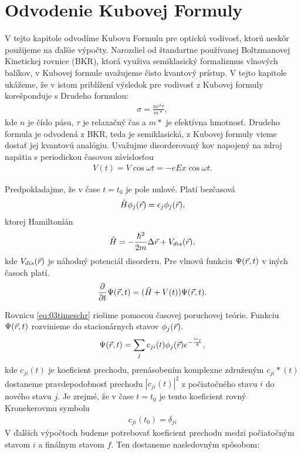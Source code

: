 \section{Odvodenie Kubovej Formuly}
V tejto kapitole odvodíme Kubovu Formulu pre optickú vodivosť, ktorú neskôr použijeme na ďalšie výpočty.
Narozdiel od štandartne používanej Boltzmanovej Kinetickej rovnice (BKR), ktorá využiva semiklasický 
formalizmus vlnových balíkov, v Kubovej formule uvažujeme čisto kvantový prístup. V tejto kapitole 
ukážeme, že v istom priblížení výsledok pre vodivosť z Kubovej formuly korešponduje s Drudeho formulou:
\begin{align}
\label{eq:03drude}
\sigma=\frac{ne^2\tau}{m*}\mathrm{,}
\end{align}
kde $n$ je číslo pásu, $\tau$ je relaxačný čas a $m*$ je efektívna hmotnosť. Drudeho formula je odvodená z 
BKR, teda je semiklasická, z Kubovej formuly vieme dostať jej kvantovú analógiu.
Uvažujme disorderovaný kov napojený na zdroj napätia s periodickou časovou závislosťou
\begin{align}
\label{eq:03potential}
V(t)=V\cos \omega t = -eEx \cos \omega t \mathrm{.}
\end{align}

Predpokladajme, že v čase $t=t_0$ je pole nulové. Platí bezčasová \schr
\begin{align}
\label{eq:03schr}
\hat{H} \phi_j(\vec{r})= \epsilon_j\phi_j(\vec{r}) \mathrm{,}
\end{align}
ktorej Hamiltoníán
\begin{align}
\label{eq:03Hamiltonian}
\hat{H}= - \frac{\hbar^2}{2m}\Delta \vec{r} + V_{dis}(\vec{r}) \mathrm{,} 
\end{align}
kde $V_{dis}(\vec{r})$ je náhodný potenciál disorderu. Pre vlnovú funkciu $\Psi(\vec{r},t)$ v iných časoch platí. 
\begin{align}
\label{eq:03timeschr}
\frac{\partial}{\partial t} \Psi(\vec{r},t) = (\hat{H} + V(t))\Psi(\vec{r},t)\mathrm{.}
\end{align}

Rovnicu \eqref{eq:03timeschr}  riešime pomocou časovej poruchovej teórie. Funkciu $\Psi(\vec{r},t)$ rozvinieme do stacionárnych stavov $\phi_j(\vec{r})$. 
\begin{align}
\label{eq:03stac}
\Psi(\vec{r},t)=\sum_j c_{ji}(t)\phi_j(\vec{r})e^{-\frac{i\epsilon_j}{\hbar}} \mathrm{,}
\end{align}
kde $c_{ji}(t)$ je koeficient prechodu, prenásobením komplexne združeným   $c_{ji}*(t)$ dostaneme pravdepodobnosť prechodu $|c_{ji}(t)|^2$ z počiatočného stavu $i$ do nového stavu $j$. Je zrejmé, že v čase $t=t_0$ je tento koeficient rovný Kronekerovmu symbolu
\begin{align}
\label{eq:03cji0}
c_{ji}(t_0)=\delta_{ji}
\end{align}  
V ďalších výpočtoch budeme potrebovať koeficient prechodu medzi počiatočným stavom $i$  a finálnym stavom $f$. Ten dostaneme nasledovným spôsobom:

